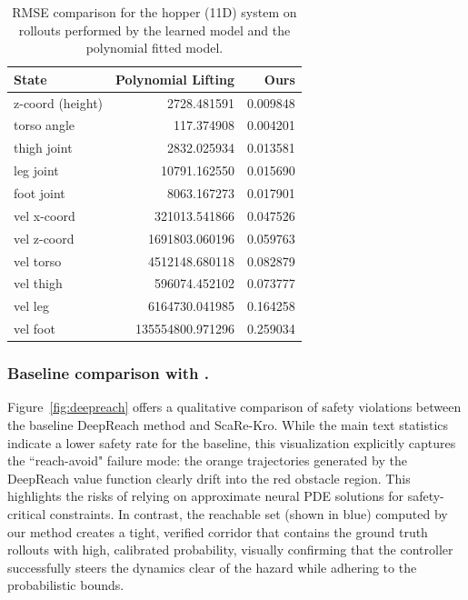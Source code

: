 \documentclass{l4dc2026}
\begin{document}
\begin{table}[ht]
\centering
\begin{tabular}{lrr}
\hline
\textbf{State} & \textbf{Polynomial Lifting} & \textbf{Ours} \\
\hline
z-coord (height)   & 2728.481591        & 0.009848 \\
torso angle        & 117.374908         & 0.004201 \\
thigh joint        & 2832.025934        & 0.013581 \\
leg joint          & 10791.162550       & 0.015690 \\
foot joint         & 8063.167273        & 0.017901 \\
vel x-coord        & 321013.541866      & 0.047526 \\
vel z-coord        & 1691803.060196     & 0.059763 \\
vel torso          & 4512148.680118     & 0.082879 \\
vel thigh          & 596074.452102      & 0.073777 \\
vel leg            & 6164730.041985     & 0.164258 \\
vel foot           & 135554800.971296   & 0.259034 \\
\hline
\end{tabular}
\caption{RMSE comparison for the hopper (11D) system on rollouts performed by the learned model and the polynomial fitted model.}
\label{tab:hopper_11d_rmse}
\end{table}

\subsubsection{Baseline comparison with \cite{deepreach}.}\label{app:deepreach}

Figure~\ref{fig:deepreach} offers a qualitative comparison of safety violations between the baseline DeepReach method \citep{deepreach} and ScaRe-Kro. While the main text statistics indicate a lower safety rate for the baseline, this visualization explicitly captures the ``reach-avoid" failure mode: the orange trajectories generated by the DeepReach value function clearly drift into the red obstacle region. This highlights the risks of relying on approximate neural PDE solutions for safety-critical constraints. In contrast, the reachable set (shown in blue) computed by our method creates a tight, verified corridor that contains the ground truth rollouts with high, calibrated probability, visually confirming that the controller successfully steers the dynamics clear of the hazard while adhering to the probabilistic bounds.
\end{document}
